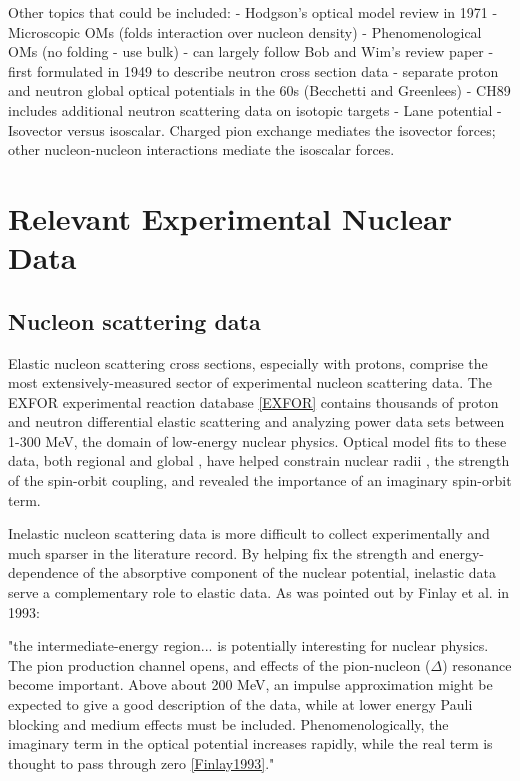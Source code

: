 
Other topics that could be included:
- Hodgson's optical model review in 1971
- Microscopic OMs (folds interaction over nucleon density)
- Phenomenological OMs (no folding - use bulk)
- can largely follow Bob and Wim's review paper
- first formulated in 1949 to describe neutron cross section data
- separate proton and neutron global optical potentials in the 60s (Becchetti
and Greenlees)
- CH89 includes additional neutron scattering data on isotopic targets
- Lane potential 
- Isovector versus isoscalar. Charged pion exchange mediates the isovector forces;
other nucleon-nucleon interactions mediate the isoscalar forces.

\section{Relevant Experimental Nuclear Data}

\subsection{Nucleon scattering data}
Elastic nucleon scattering cross sections, especially with protons, comprise the most extensively-measured
sector of experimental nucleon scattering data. The EXFOR experimental reaction database
\ref{EXFOR} contains thousands of proton and neutron differential elastic scattering and analyzing
power data sets between 1-300 MeV, the domain of low-energy nuclear physics. Optical model fits
to these data, both regional and global \cite{CH89, KoningDelaroche}, have helped
constrain nuclear radii \cite{radiusExample}, the strength of the spin-orbit coupling,
and revealed the importance of an imaginary spin-orbit term.

Inelastic nucleon scattering data is more difficult to collect experimentally and much sparser in
the literature record. By helping fix the strength and energy-dependence of the absorptive component
of the nuclear potential, inelastic data serve a complementary role to elastic
data. As was pointed out by Finlay et al. in 1993:

\begin{displayquote}
    "the intermediate-energy region... is potentially interesting for nuclear physics.
    The pion production channel opens, and effects of the pion-nucleon ($\Delta$) resonance
    become important. Above about 200 MeV, an impulse approximation might be expected to
    give a good description of the data, while at lower energy Pauli blocking and
    medium effects must be included. Phenomenologically, the imaginary term in
    the optical potential increases rapidly, while the real term is thought to
    pass through zero \ref{Finlay1993}."
\end{displayquote}

